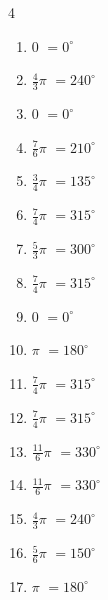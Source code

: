\begin{multicols}{4}
\begin{enumerate}
  \item $\displaystyle 0$
        $\displaystyle =0^{\circ}$

  \item $\displaystyle \frac{4}{3}\pi$
        $\displaystyle =240^{\circ}$

  \item $\displaystyle 0$
        $\displaystyle =0^{\circ}$

  \item $\displaystyle \frac{7}{6}\pi$
        $\displaystyle =210^{\circ}$

  \item $\displaystyle \frac{3}{4}\pi$
        $\displaystyle =135^{\circ}$

  \item $\displaystyle \frac{7}{4}\pi$
        $\displaystyle =315^{\circ}$

\columnbreak %

  \item $\displaystyle \frac{5}{3}\pi$
        $\displaystyle =300^{\circ}$

  \item $\displaystyle \frac{7}{4}\pi$
        $\displaystyle =315^{\circ}$

  \item $\displaystyle 0$
        $\displaystyle =0^{\circ}$

  \item $\displaystyle \pi$
        $\displaystyle =180^{\circ}$

  \item $\displaystyle \frac{7}{4}\pi$
        $\displaystyle =315^{\circ}$

  \item $\displaystyle \frac{7}{4}\pi$
        $\displaystyle =315^{\circ}$

  \item $\displaystyle \frac{11}{6}\pi$
        $\displaystyle =330^{\circ}$

  \item $\displaystyle \frac{11}{6}\pi$
        $\displaystyle =330^{\circ}$

  \item $\displaystyle \frac{4}{3}\pi$
        $\displaystyle =240^{\circ}$

  \item $\displaystyle \frac{5}{6}\pi$
        $\displaystyle =150^{\circ}$

  \item $\displaystyle \pi$
        $\displaystyle =180^{\circ}$


\end{enumerate}
\end{multicols}

